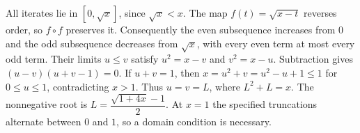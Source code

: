 All iterates lie in $[0,\sqrt x]$, since $\sqrt x<x$. The map $f(t)=\sqrt{x-t}$ reverses order, so $f\circ f$ preserves it. Consequently the even subsequence increases from $0$ and the odd subsequence decreases from $\sqrt x$, with every even term at most every odd term. Their limits $u\le v$ satisfy $u^2=x-v$ and $v^2=x-u$. Subtraction gives $(u-v)(u+v-1)=0$. If $u+v=1$, then $x=u^2+v=u^2-u+1\le1$ for $0\le u\le1$, contradicting $x>1$. Thus $u=v=L$, where $L^2+L=x$. The nonnegative root is $\boxed{L=\dfrac{\sqrt{1+4x}-1}{2}}$. At $x=1$ the specified truncations alternate between $0$ and $1$, so a domain condition is necessary.
